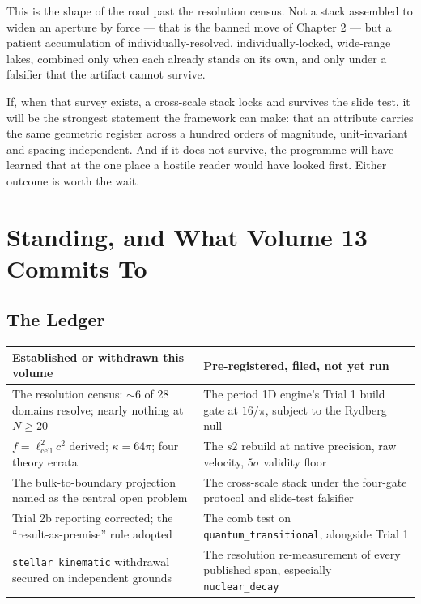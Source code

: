 \documentclass[11pt, letterpaper, openany]{book}
\begin{document}
\begin{signalbox}
This is the shape of the road past the resolution census. Not a stack assembled to widen an
aperture by force --- that is the banned move of Chapter 2 --- but a patient accumulation of
individually-resolved, individually-locked, wide-range lakes, combined only when each already
stands on its own, and only under a falsifier that the artifact cannot survive.

\medskip
\noindent If, when that survey exists, a cross-scale stack locks and survives the slide test, it
will be the strongest statement the framework can make: that an attribute carries the same
geometric register across a hundred orders of magnitude, unit-invariant and spacing-independent.
And if it does not survive, the programme will have learned that at the one place a hostile reader
would have looked first. Either outcome is worth the wait.
\end{signalbox}

\chapter{Standing, and What Volume 13 Commits To}

\section{The Ledger}

\begin{table}[H]
\centering
\small
\begin{tabular}{@{}p{}p{}@{}}
\toprule
\textbf{Established or withdrawn this volume} & \textbf{Pre-registered, filed, not yet run} \\
\midrule
The resolution census: $\sim$6 of 28 domains resolve; nearly nothing at $N \geq 20$ & The period
1D engine's Trial 1 build gate at $16/\pi$, subject to the Rydberg null \\
\addlinespace
$f = \ell_{\mathrm{cell}}^2 c^2$ derived; $\kappa = 64\pi$; four theory errata & The $s2$ rebuild
at native precision, raw velocity, $5\sigma$ validity floor \\
\addlinespace
The bulk-to-boundary projection named as the central open problem & The cross-scale stack under the
four-gate protocol and slide-test falsifier \\
\addlinespace
Trial 2b reporting corrected; the ``result-as-premise'' rule adopted & The comb test on
\texttt{quantum\_transitional}, alongside Trial 1 \\
\addlinespace
\texttt{stellar\_kinematic} withdrawal secured on independent grounds & The resolution
re-measurement of every published span, especially \texttt{nuclear\_decay} \\
\bottomrule
\end{tabular}
\end{table}
\end{document}
